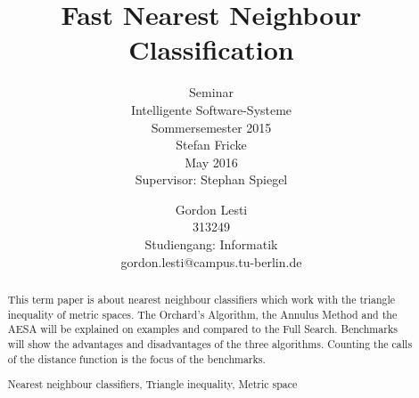 \documentclass[runningheads,a4paper]{llncs}
\newcommand{\keywords}[1]{\par\addvspace\baselineskip
\noindent\keywordname\enspace\ignorespaces#1}
\begin{document}
\mainmatter

\title{Fast Nearest Neighbour Classification}
\subtitle{\textnormal{\small{Seminar\\
Intelligente Software-Systeme\\
Sommersemester 2015\\\vspace{1\baselineskip}
Stefan Fricke\\\vspace{2\baselineskip}
May 2016\\
Supervisor: Stephan Spiegel\\\vspace{1\baselineskip}}}}


\author{Gordon Lesti\\313249\\Studiengang: Informatik\\gordon.lesti@campus.tu-berlin.de\\\vspace{5\baselineskip}}



\maketitle
{}

\begin{abstract}
This term paper is about nearest neighbour classifiers which work with the triangle inequality of metric spaces. The
Orchard’s Algorithm, the Annulus Method and the AESA will be explained on examples and compared to the Full Search.
Benchmarks will show the advantages and disadvantages of the three algorithms. Counting the calls of the distance
function is the focus of the benchmarks.
\keywords{Nearest neighbour classifiers, Triangle inequality, Metric space}
\end{abstract}
\end{document}
